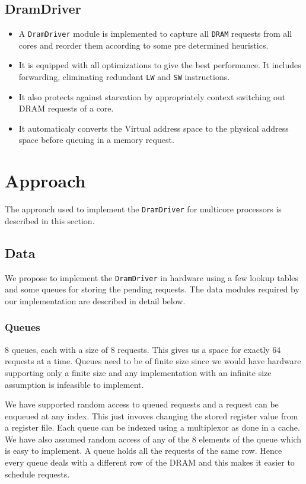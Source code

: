 \documentclass[hidelinks,12pt]{article}
\begin{document}
\subsection{DramDriver}
\begin{itemize}
    \item A \verb|DramDriver| module is implemented to capture all \verb|DRAM| requests from all cores and reorder them according to some pre determined heuristics.
    \item It is equipped with all optimizations to give the best performance. It includes forwarding, eliminating redundant \verb|LW| and \verb|SW| instructions.
    \item It also protects against starvation by appropriately context switching out DRAM requests of a core.
    \item It automaticaly converts the Virtual address space to the physical address space before queuing in a memory request.
\end{itemize}

\section{Approach}

The approach used to implement the \verb|DramDriver| for multicore processors is described in this section.
\subsection{Data}
We propose to implement the \verb|DramDriver| in hardware using a few lookup tables and some queues for storing the pending requests.
The data modules required by our implementation are described in detail below.
\subsubsection{Queues}
$8$ queues, each with a size of $8$ requests. This gives us a space for exactly $64$ requests at a time.
Queues need to be of finite size since we would have hardware supporting only a finite size and any implementation with an infinite size assumption is infeasible to implement.

We have supported random access to queued requests and a request can be enqueued at any index. This just invoves changing the stored register value from a register file.
Each queue can be indexed using a multiplexor as done in a cache.
We have also assumed random access of any of the 8 elements of the queue which is easy to implement.
A queue holds all the requests of the same row. Hence every queue deals with a different row of the DRAM and this makes it easier to schedule requests.\\
\end{document}
